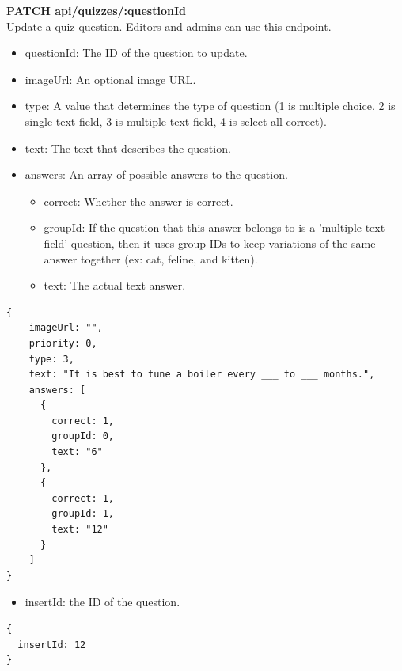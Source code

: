 \documentclass[onecolumn, draftclsnofoot,10pt, compsoc, usenames, dvipsnames]{IEEEtran}
\begin{document}
\noindent
\textbf{\textcolor{BlueGreen}{PATCH} api/quizzes/:questionId} \\
Update a quiz question. Editors and admins can use this endpoint.
\begin{itemize}
    \item questionId: The ID of the question to update.
    \item imageUrl: An optional image URL.
    \item type: A value that determines the type of question (1 is multiple choice, 2 is single text field, 3 is multiple text field, 4 is select all correct).
    \item text: The text that describes the question.
    \item answers: An array of possible answers to the question.
        \begin{itemize}
          \item correct: Whether the answer is correct.
          \item groupId: If the question that this answer belongs to is a 'multiple text field' question, then it uses group IDs to keep variations of the same answer together (ex: cat, feline, and kitten).
          \item text: The actual text answer.
        \end{itemize}
\end{itemize}
\begin{lstlisting}[caption=Example Request Body]
{ 
    imageUrl: "",
    priority: 0,
    type: 3,
    text: "It is best to tune a boiler every ___ to ___ months.",
    answers: [
      {
        correct: 1,
        groupId: 0,
        text: "6"
      },
      {
        correct: 1,
        groupId: 1,
        text: "12"
      }
    ]
}
\end{lstlisting}
\begin{itemize}
    \item insertId: the ID of the question.
\end{itemize}
\begin{lstlisting}[caption=Example Response]
{
  insertId: 12
}
\end{lstlisting}
\\~\\
\end{document}
